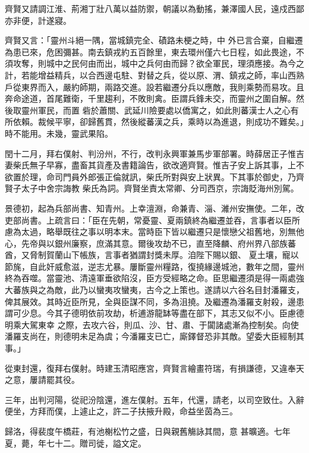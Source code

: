 \begin{pinyinscope}
 齊賢又請調江淮、荊湘丁壯八萬以益防禦，朝議以為動搖，兼澤國人民，遠戍西鄙亦非便，計遂寢。



 齊賢又言：「靈州斗絕一隅，當城鎮完全、磧路未梗之時，中
 外已言合棄，自繼遷為患已來，危困彌甚。南去鎮戎約五百餘里，東去環州僅六七日程，如此畏途，不須攻奪，則城中之民何由而出，城中之兵何由而歸？欲全軍民，理須應接。為今之計，若能增益精兵，以合西邊屯駐、對替之兵，從以原、渭、鎮戎之師，率山西熟戶從東界而入，嚴約師期，兩路交進。設若繼遷分兵以應敵，我則乘勢而易攻。且奔命途道，首尾難衛，千里趨利，不敗則禽。臣謂兵鋒未交，而靈州之圍自解。然後取靈州軍民，而置
 砦於蕭關、武延川險要處以僑寓之，如此則蕃漢士人之心有所依賴。裁候平寧，卻歸舊貫，然後縱蕃漢之兵，乘時以為進退，則成功不難矣。」時不能用。未幾，靈武果陷。



 閏十二月，拜右僕射、判汾州，不行，改判永興軍兼馬步軍部署。時薛居正子惟吉妻柴氏無子早寡，盡畜其貨產及書籍論告，欲改適齊賢。惟吉子安上訴其事，上不欲置於理，命司門員外郎張正倫就訊，柴氏所對與安上狀異。下其事於御史，乃齊賢子太子中舍宗誨教
 柴氏為詞。齊賢坐責太常卿、分司西京，宗誨貶海州別駕。



 景德初，起為兵部尚書、知青州。上幸澶淵，命兼青、淄、濰州安撫使。二年，改吏部尚書。上疏言曰：「臣在先朝，常憂靈、夏兩鎮終為繼遷並吞，言事者以臣所慮為太過，略舉既往之事以明本末。當時臣下皆以繼遷只是懷戀父祖舊地，別無他心，先帝與以銀州廉察，庶滿其意。爾後攻劫不已，直至降麟、府州界八部族蕃酋，又脅制賀蘭山下帳族，言事者猶謂封獎未厚。洎陛下賜以銀、
 夏土壤，寵以節旄，自此奸威愈滋，逆志尤暴。屢斷靈州糧路，復撓緣邊城池，數年之間，靈州終為吞噬。當靈池、清遠軍垂欲陷沒，臣方受經略之命。臣思繼遷須是得一兩處強大蕃族與之為敵，此乃以蠻夷攻蠻夷，古今之上策也。遂請以六谷名目封潘羅支，俾其展效。其時近臣所見，全與臣謀不同，多為沮撓。及繼遷為潘羅支射殺，邊患謂可少息。今其子德明依前攻劫，析逋游龍缽等盡在部下，其志又似不小。臣慮德明乘大駕東幸
 之際，去攻六谷，則瓜、沙、甘、肅、于闐諸處漸為控制矣。向使潘羅支尚在，則德明未足為虞；今潘羅支已亡，廝鐸督恐非其敵。望委大臣經制其事。」



 從東封還，復拜右僕射。時建玉清昭應宮，齊賢言繪畫符瑞，有損謙德，又違奉天之意，屢請罷其役。



 三年，出判河陽，從祀汾陰還，進左僕射。五年，代還，請老，以司空致仕。入辭便坐，方拜而僕，上遽止之，許二子扶掖升殿，命益坐茵為三。



 歸洛，得裴度午橋莊，有池榭松竹之盛，日與親舊觴詠其間，意
 甚曠適。七年夏，薨，年七十二。贈司徙，謚文定。




\end{pinyinscope}
